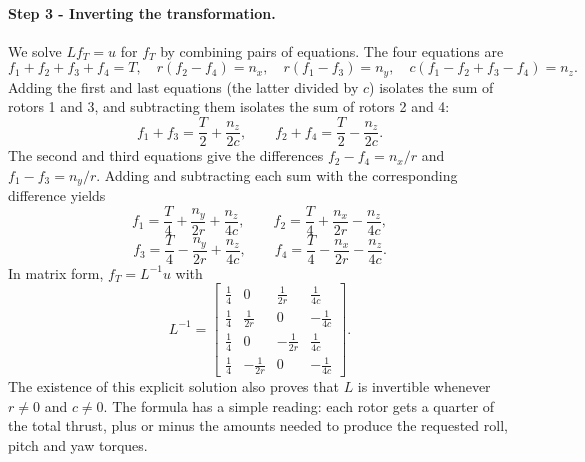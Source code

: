 \paragraph{Step 3 - Inverting the transformation.}
We solve $L f_T = u$ for $f_T$ by combining pairs of equations.
The four equations are
\begin{equation*}
f_1 + f_2 + f_3 + f_4 = T, \quad
r(f_2 - f_4) = n_x, \quad
r(f_1 - f_3) = n_y, \quad
c(f_1 - f_2 + f_3 - f_4) = n_z .
\end{equation*}
Adding the first and last equations (the latter divided by $c$) isolates the sum of rotors 1 and 3, and subtracting them isolates the sum of rotors 2 and 4:
\begin{equation*}
f_1 + f_3 = \frac{T}{2} + \frac{n_z}{2c}, \qquad
f_2 + f_4 = \frac{T}{2} - \frac{n_z}{2c}.
\end{equation*}
The second and third equations give the differences $f_2 - f_4 = n_x / r$ and $f_1 - f_3 = n_y / r$.
Adding and subtracting each sum with the corresponding difference yields
\begin{equation*}
f_1 = \frac{T}{4} + \frac{n_y}{2r} + \frac{n_z}{4c}, \qquad
f_2 = \frac{T}{4} + \frac{n_x}{2r} - \frac{n_z}{4c},
\end{equation*}
\begin{equation*}
f_3 = \frac{T}{4} - \frac{n_y}{2r} + \frac{n_z}{4c}, \qquad
f_4 = \frac{T}{4} - \frac{n_x}{2r} - \frac{n_z}{4c}.
\end{equation*}
In matrix form, $f_T = L^{-1} u$ with
\begin{equation*}
L^{-1} = \begin{bmatrix}
\frac{1}{4} & 0 & \frac{1}{2r} & \frac{1}{4c} \\[4pt]
\frac{1}{4} & \frac{1}{2r} & 0 & -\frac{1}{4c} \\[4pt]
\frac{1}{4} & 0 & -\frac{1}{2r} & \frac{1}{4c} \\[4pt]
\frac{1}{4} & -\frac{1}{2r} & 0 & -\frac{1}{4c}
\end{bmatrix}.
\end{equation*}
The existence of this explicit solution also proves that $L$ is invertible whenever $r \neq 0$ and $c \neq 0$.
The formula has a simple reading: each rotor gets a quarter of the total thrust, plus or minus the amounts needed to produce the requested roll, pitch and yaw torques.
